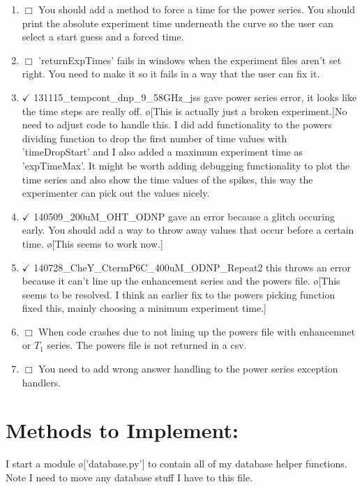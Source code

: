 \documentclass[10pt]{book}
\begin{document}
\begin{enumerate}
    \item $\Box$ You should add a method to force a time for the power series. You should print the absolute experiment time underneath the curve so the user can select a start guess and a forced time.
    \item $\Box$ 'returnExpTimes' fails in windows when the experiment files aren't set right. You need to make it so it fails in a way that the user can fix it.
    \item $\checkmark$ 131115_tempcont_dnp_9_58GHz_jss gave power series error, it looks like the time steps are really off. \o[This is actually just a broken experiment.]{No need to adjust code to handle this. I did add functionality to the powers dividing function to drop the first number of time values with 'timeDropStart' and I also added a maximum experiment time as 'expTimeMax'. It might be worth adding debugging functionality to plot the time series and also show the time values of the spikes, this way the experimenter can pick out the values nicely.}
    \item $\checkmark$ 140509_200uM_OHT_ODNP gave an error because a glitch occuring early. You should add a way to throw away values that occur before a certain time. \o[This seems to work now.]{}
    \item $\checkmark$ 140728_CheY_CtermP6C_400uM_ODNP_Repeat2 this throws an error because it can't line up the enhancement series and the powers file. \o[This seems to be resolved. I think an earlier fix to the powers picking function fixed this, mainly choosing a minimum experiment time.]{}
    \item $\Box$ When code crashes due to not lining up the powers file with enhancemnet or $T_1$ series. The powers file is not returned in a csv.
    \item $\Box$ You need to add wrong answer handling to the power series exception handlers.
\end{enumerate}
\section{Methods to Implement:}
I start a module \o['database.py']{} to contain all of my database helper functions. Note I need to move any database stuff I have to this file.
\end{document}
